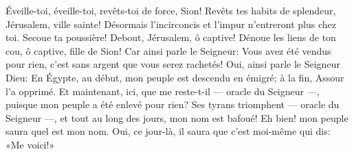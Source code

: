 Éveille-toi, éveille-toi, revêts-toi de force, Sion!
	Revêts tes habits de splendeur, Jérusalem, ville sainte!
	Désormais l’incirconcis et l’impur n’entreront plus chez toi.
Secoue ta poussière! Debout, Jérusalem, ô captive!
	Dénoue les liens de ton cou, ô captive, fille de Sion!
Car ainsi parle le Seigneur:
	Vous avez été vendus pour rien, c’est sans argent que vous serez rachetés!
Oui, ainsi parle le Seigneur Dieu:
	En Égypte, au début, mon peuple est descendu en émigré;
	à la fin, Assour l’a opprimé.
Et maintenant, ici, que me reste-t-il --- oracle du Seigneur ---,
	puisque mon peuple a été enlevé pour rien?
Ses tyrans triomphent --- oracle du Seigneur ---,
	et tout au long des jours, mon nom est bafoué!
Eh bien! mon peuple saura quel est mon nom.
	Oui, ce jour-là, il saura que c’est moi-même qui dis: «Me voici!»
